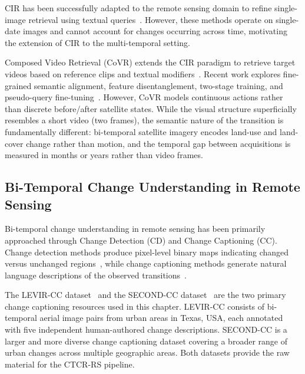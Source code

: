 CIR has been successfully adapted to the remote sensing
domain to refine single-image retrieval using textual
queries~\cite{psomas2024cir, wang2024scene, yang2025language}.
However, these methods operate on single-date images and
cannot account for changes occurring across time, motivating
the extension of CIR to the multi-temporal setting.
 
Composed Video Retrieval (CoVR) extends the CIR paradigm to
retrieve target videos based on reference clips and textual
modifiers~\cite{ventura2024covr, ventura2024covr2}. Recent
work explores fine-grained semantic alignment, feature
disentanglement, two-stage training, and pseudo-query
fine-tuning~\cite{gupta2025play, thawakar2024composed,
wu2025fine, zhang2024localizing}. However, CoVR models
continuous actions rather than discrete before/after
satellite states. While the visual structure superficially
resembles a short video (two frames), the semantic nature
of the transition is fundamentally different: bi-temporal
satellite imagery encodes land-use and land-cover change
rather than motion, and the temporal gap between
acquisitions is measured in months or years rather than
video frames. %
 
\subsection{Bi-Temporal Change Understanding in Remote Sensing}
\label{sec:chap7_rw_change}
 
Bi-temporal change understanding in remote sensing has been
primarily approached through Change Detection (CD) and
Change Captioning (CC). Change detection methods produce
pixel-level binary maps indicating changed versus unchanged
regions~\cite{peng2025deep}, while change captioning methods
generate natural language descriptions of the observed
transitions~\cite{liu2022levir, karaca2025secondcc}.
 
The LEVIR-CC dataset~\cite{liu2022levir} and the SECOND-CC
dataset~\cite{karaca2025secondcc} are the two primary
change captioning resources used in this chapter. LEVIR-CC
consists of bi-temporal aerial image pairs from urban areas
in Texas, USA, each annotated with five independent
human-authored change descriptions. SECOND-CC is a larger
and more diverse change captioning dataset covering a broader
range of urban changes across multiple geographic areas.
Both datasets provide the raw material for the CTCR-RS
pipeline.
 
